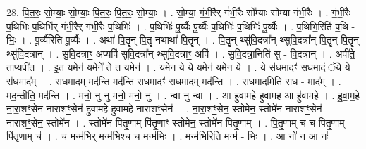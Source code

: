 \documentclass[17pt]{extarticle}
\begin{document}
28. पि॒त॒रः॒ सो॒म्याः॒ सो॒म्याः॒ पि॒त॒रः॒ पि॒त॒रः॒ सो॒म्याः॒ । . सो॒म्या॒ गं॒भी॒रैर् गं॑भी॒रैः सो᳚म्याः सोम्या गंभी॒रैः । . गं॒भी॒रैः प॒थिभिः॑ प॒थिभि॑र् गंभी॒रैर् गं॑भी॒रैः प॒थिभिः॑ । . प॒थिभिः॑ पू॒र्व्यैः पू॒र्व्यैः प॒थिभिः॑ प॒थिभिः॑ पू॒र्व्यैः । . प॒थिभि॒रिति॑ प॒थि - भिः॒ । . पू॒र्व्यैरिति॑ पू॒र्व्यैः । . अथा॑ पि॒तॄन् पि॒तॄ नथाथा॑ पि॒तॄन् । . पि॒तॄन् थ्सु॑वि॒दत्रा᳚न् थ्सुवि॒दत्रा᳚न् पि॒तॄन् पि॒तॄन् थ्सु॑वि॒दत्रान्॑ । . सु॒वि॒दत्राꣳ॒॒ अप्यपि॑ सुवि॒दत्रा᳚न् थ्सुवि॒दत्राꣳ॒॒ अपि॑ । . सु॒वि॒दत्रा॒निति॑ सु - वि॒दत्रान्॑ । . अपी॑ते॒ ताप्यपी॑त । . इ॒त॒ य॒मेन॑ य॒मेने॑ ते त य॒मेन॑ । . य॒मेन॒ ये ये य॒मेन॑ य॒मेन॒ ये । . ये स॑ध॒मादꣳ॑ सध॒मादं॒ ॅये ये स॑ध॒माद᳚म् । . स॒ध॒माद॒म् मद॑न्ति॒ मद॑न्ति सध॒मादꣳ॑ सध॒माद॒म् मद॑न्ति । . स॒ध॒माद॒मिति॑ सध - माद᳚म् । . मद॒न्तीति॒ मद॑न्ति । . मनो॒ नु नु मनो॒ मनो॒ नु । . न्वा नु न्वा । . आ हु॑वामहे हुवामह॒ आ हु॑वामहे । . हु॒वा॒म॒हे॒ ना॒रा॒शꣳ॒॒सेन॑ नाराशꣳ॒॒सेन॑ हुवामहे हुवामहे नाराशꣳ॒॒सेन॑ । . ना॒रा॒शꣳ॒॒सेन॒ स्तोमे॑न॒ स्तोमे॑न नाराशꣳ॒॒सेन॑ नाराशꣳ॒॒सेन॒ स्तोमे॑न । . स्तोमे॑न पितृ॒णाम् पि॑तृ॒णाꣳ स्तोमे॑न॒ स्तोमे॑न पितृ॒णाम् । . पि॒तृ॒णाम् च॑ च पितृ॒णाम् पि॑तृ॒णाम् च॑ । . च॒ मन्म॑भि॒र् मन्म॑भिश्च च॒ मन्म॑भिः । . मन्म॑भि॒रिति॒ मन्म॑ - भिः॒ । . आ नो॑ न॒ आ नः॑ । \newline
\end{document}
